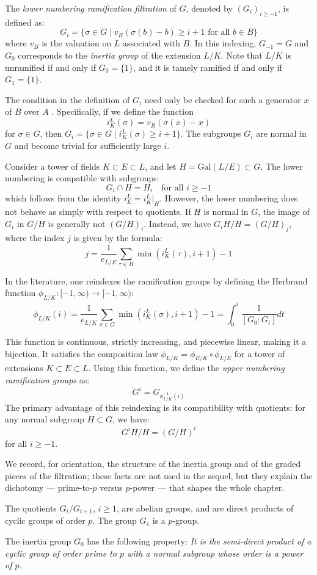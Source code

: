 The \textit{lower numbering ramification filtration} of $G$, denoted by $(G_i)_{i \geq -1}$, is defined as:
\[
G_i = \{ \sigma \in G \mid v_B(\sigma (b) - b) \geq i + 1 \text{ for all } b \in B \}
\]
where $v_B$ is the valuation on $L$ associated with $B$. In this indexing, $G_{-1} = G$ and $G_0$
corresponds to the \textit{inertia group} of the extension $L/K$. Note that $L/K$ is unramified if and only if
$G_0 = \{1\}$, and it is tamely ramified if and only if $G_1 = \{1\}$.

The condition in the definition of $G_i$ need only be checked for such a generator $x$ of $B$ over $A$
\cite[Chapter~IV, \S1, Lemma~1]{serreLF}.
Specifically, if we define the function
\[
i^L_K(\sigma) = v_B(\sigma(x) - x)
\]
for $\sigma \in G$, then $G_i = \{ \sigma \in G \mid i^L_K(\sigma) \geq i + 1 \}$.
The subgroups $G_i$ are normal in $G$ and become trivial for sufficiently large $i$.

Consider a tower of fields $K \subset E \subset L$, and let $H = \text{Gal}(L/E) \subset G$. The lower numbering is compatible with subgroups:
\[
G_i \cap H = H_i \quad \text{for all } i \geq -1
\]
which follows from the identity $i^L_E = i^L_K|_{H}$.
However, the lower numbering does not behave as simply with respect to quotients. If $H$ is normal in $G$, the image of $G_i$ in $G/H$ is generally not $(G/H)_i$.
Instead, we have $G_i H / H = (G/H)_j$, where the index $j$ is given by the formula:
\[
j = \frac{1}{e_{L/E}} \sum_{\tau \in H} \min(i^L_K(\tau), i+1) - 1
\]


In the literature, one reindexes the ramification groups by defining the Herbrand function $\phi_{L/K} : [-1, \infty ) \to [-1, \infty )$:
\[ \phi_{L/K}(i) = \frac{1}{e_{L/K}}\sum_{\sigma \in G} \min(i^L_K(\sigma), i+1)-1 = \int _0^i \frac{1}{[G_0 : G_t]} dt \]

This function is continuous, strictly increasing, and piecewise linear, making it a bijection.
It satisfies the composition law $\phi_{L/K} = \phi_{E/K} \circ \phi_{L/E}$ for a tower of extensions $K \subset E \subset L$.
Using this function, we define the \textit{upper numbering ramification groups} as:
\[
G^i = G_{\phi_{L/K}^{-1}(i)}
\]
The primary advantage of this reindexing is its compatibility with quotients: for any normal subgroup $H \subset G$, we have:
\[
G^i H / H = (G/H)^i
\]
for all $i \geq -1$.

We record, for orientation, the structure of the inertia group and of the
graded pieces of the filtration; these facts are not used in the sequel, but
they explain the dichotomy --- prime-to-$p$ versus $p$-power --- that shapes
the whole chapter.

\begin{prop}
    The quotients $G_i/G_{i+1}$, $i \geq 1$, are abelian groups, and are direct products of cyclic groups of order $p$.
    The group $G_1$ is a $p$-group.
\end{prop}

\begin{prop}
    The inertia group $G_0$ has the following property:
    \textit{It is the semi-direct product of a cyclic group of order prime to $p$ with a normal subgroup whose order is a power of $p$.}
\end{prop}
